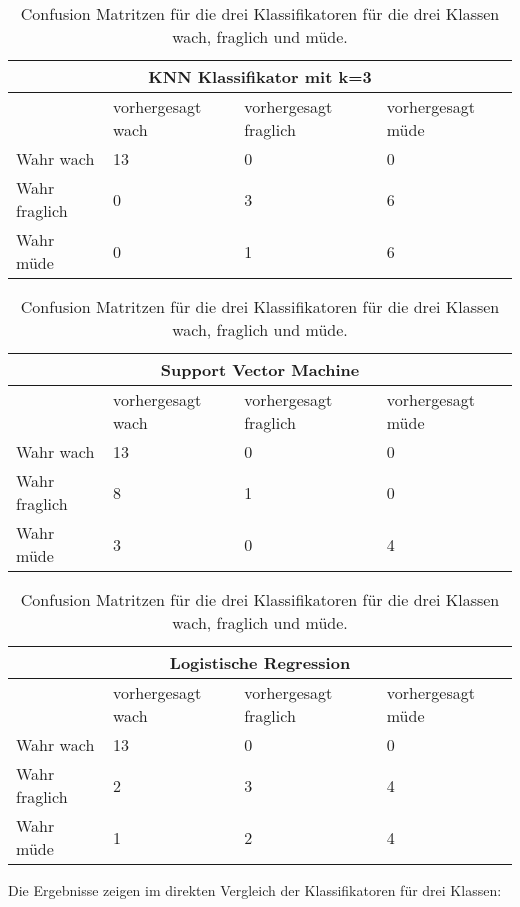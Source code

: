 \begin{table}
    \centering
    \begin{tabular}{|l|l|l|l|}
    \hline
    \multicolumn{4}{|c|}{\textbf{KNN Klassifikator mit k=3}} \\ \hline
    & vorhergesagt wach & vorhergesagt fraglich & vorhergesagt müde \\ \hline
    {Wahr wach} & 13 & 0 & 0 \\ \hline
    {Wahr fraglich} & 0 & 3 & 6 \\ \hline
    {Wahr müde} & 0 & 1 & 6 \\ \hline
    \end{tabular}
    
    \vspace{0.5cm} %
    
    \begin{tabular}{|l|l|l|l|}
    \hline
    \multicolumn{4}{|c|}{\textbf{Support Vector Machine}} \\ \hline
    & vorhergesagt wach & vorhergesagt fraglich & vorhergesagt müde \\ \hline
    {Wahr wach} & 13 & 0 & 0 \\ \hline
    {Wahr fraglich} & 8 & 1 & 0 \\ \hline
    {Wahr müde} & 3 & 0 & 4 \\ \hline
    \end{tabular}
    
    \vspace{0.5cm} %
    
    \begin{tabular}{|l|l|l|l|}
    \hline
    \multicolumn{4}{|c|}{\textbf{Logistische Regression}} \\ \hline
    & vorhergesagt wach & vorhergesagt fraglich & vorhergesagt müde \\ \hline
    {Wahr wach} & 13 & 0 & 0 \\ \hline
    {Wahr fraglich} & 2 & 3 & 4 \\ \hline
    {Wahr müde} & 1 & 2 & 4 \\ \hline
    \end{tabular}

\caption{Confusion Matritzen für die drei Klassifikatoren für die drei Klassen wach, fraglich und müde.}
\label{table:confusionmatrixthreeclasses}
\end{table}

Die Ergebnisse zeigen im direkten Vergleich der Klassifikatoren für drei Klassen:

